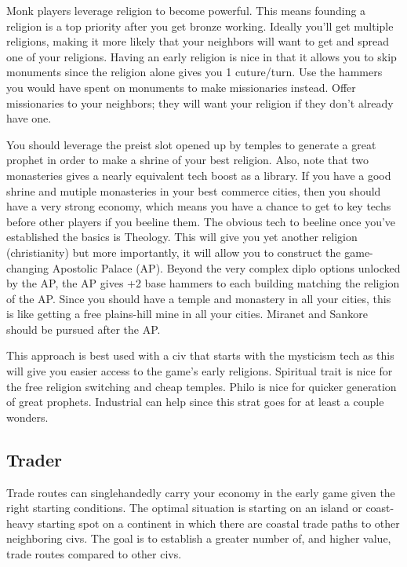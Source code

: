 \documentclass[10pt]{article}
\begin{document}
Monk players leverage religion to become powerful. This means founding
a religion is a top priority after you get bronze working. Ideally
you'll get multiple religions, making it more likely that your
neighbors will want to get and spread one of your religions. Having an
early religion is nice in that it allows you to skip monuments since
the religion alone gives you 1 cuture/turn. Use the hammers you would
have spent on monuments to make missionaries instead. Offer
missionaries to your neighbors; they will want your religion if they
don't already have one.

You should leverage the preist slot opened up
by temples to generate a great prophet in order to make a shrine of
your best religion. Also, note that two monasteries gives a nearly
equivalent tech boost as a library. If you have a good shrine and
mutiple monasteries in your best commerce cities, then you should have
a very strong economy, which means you have a chance to get to key
techs before other players if you beeline them. The obvious tech to
beeline once you've established the basics is Theology. This will give
you yet another religion (christianity) but more importantly, it will
allow you to construct the game-changing Apostolic Palace (AP). Beyond
the very complex diplo options unlocked by the AP, the AP gives +2
base hammers to each building matching the religion of the AP. Since
you should have a temple and monastery in all your cities, this is
like getting a free plains-hill mine in all your cities.  Miranet and
Sankore should be pursued after the AP.

This approach is best used with a civ that starts with the mysticism
tech as this will give you easier access to the game's early
religions. Spiritual trait is nice for the free religion switching and
cheap temples.  Philo is nice for quicker generation of great
prophets. Industrial can help since this strat goes for at least a
couple wonders.

\subsection*{Trader}

Trade routes can singlehandedly carry your economy in the early game
given the right starting conditions.  The optimal situation is
starting on an island or coast-heavy starting spot on a continent in
which there are coastal trade paths to other neighboring civs. The
goal is to establish a greater number of, and higher value, trade
routes compared to other civs.
\end{document}
